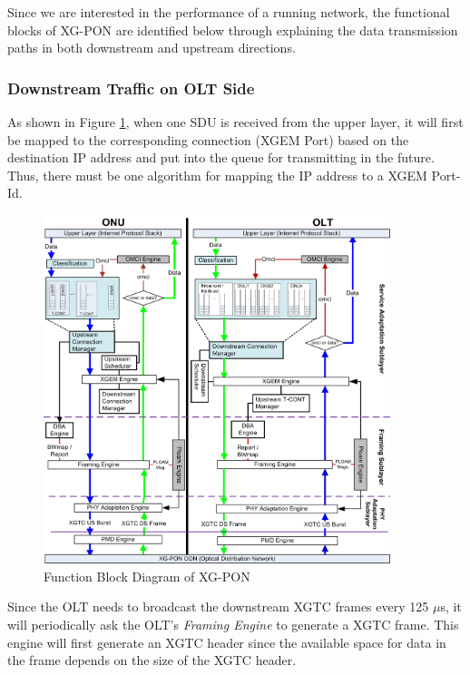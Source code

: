 Since we are interested in the performance of a running network,
the functional blocks of XG-PON are identified below through
explaining the data transmission paths in both downstream and
upstream directions.

\subsubsection{Downstream Traffic on OLT Side}

As shown in Figure \ref{fig_xgpon_functionblock}, when one SDU is
received from the upper layer, it will first be mapped to the
corresponding connection (XGEM Port) based on the destination IP
address and put into the queue for transmitting in the future.
Thus, there must be one algorithm for mapping the IP address to a
XGEM Port-Id.


\begin{figure}[!htbp]
\begin{center}
\includegraphics[width=0.9\textwidth]{images/design_function_block}
\end{center}
\vspace{-0.1in}
\caption{Function Block Diagram of XG-PON}
\label{fig_xgpon_functionblock}
\end{figure}

Since the OLT needs to broadcast the downstream XGTC frames every
125 $\mu$s, it will periodically ask the OLT's \emph{Framing
Engine} to generate a XGTC frame. This engine will first generate
an XGTC header since the available space for data in the frame
depends on the size of the XGTC header.

